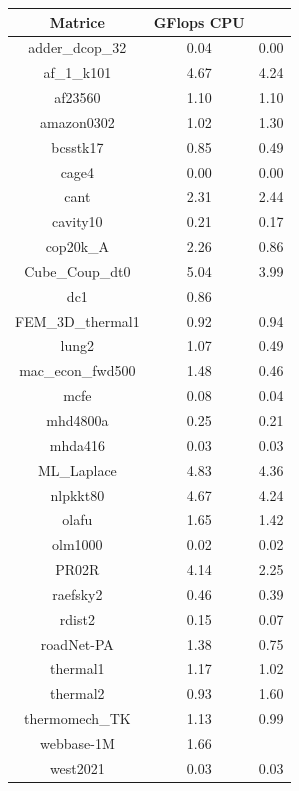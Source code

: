 \documentclass[12pt,halfline,a4paper]{ouparticle}
\begin{document}
\begin{center}
\begin{tabular}{|| c | c | c ||} 
\hline
Matrice & GFlops CPU \\ [1ex]
\hline
adder\_dcop\_32 & 0.04 & 0.00 \\
\hline
af\_1\_k101 & 4.67 & 4.24 \\
\hline
af23560 & 1.10 & 1.10 \\
\hline
amazon0302 & 1.02 & 1.30 \\
\hline
bcsstk17 & 0.85 & 0.49 \\
\hline
cage4 & 0.00 & 0.00 \\
\hline
cant & 2.31 & 2.44 \\
\hline
cavity10 & 0.21 & 0.17 \\
\hline
cop20k\_A & 2.26 & 0.86 \\
\hline
Cube\_Coup\_dt0 & 5.04 & 3.99 \\
\hline
dc1 & 0.86 &  \\
\hline
FEM\_3D\_thermal1 & 0.92 & 0.94 \\
\hline
lung2 & 1.07 & 0.49 \\
\hline
mac\_econ\_fwd500 & 1.48 & 0.46 \\
\hline
mcfe & 0.08 & 0.04 \\
\hline
mhd4800a & 0.25 & 0.21 \\
\hline
mhda416 & 0.03 & 0.03 \\
\hline
ML\_Laplace & 4.83 & 4.36 \\
\hline
nlpkkt80 & 4.67 & 4.24 \\
\hline
olafu & 1.65 & 1.42 \\
\hline
olm1000 & 0.02 & 0.02 \\
\hline
PR02R & 4.14 & 2.25 \\
\hline
raefsky2 & 0.46 & 0.39 \\
\hline
rdist2 & 0.15 & 0.07 \\
\hline
roadNet-PA & 1.38 & 0.75 \\
\hline
thermal1 & 1.17 & 1.02 \\
\hline
thermal2 & 0.93 & 1.60 \\
\hline
thermomech\_TK & 1.13 & 0.99 \\
\hline
webbase-1M & 1.66 &  \\
\hline
west2021 & 0.03 & 0.03 \\
\hline
\end{tabular}
\end{center}
\end{document}
